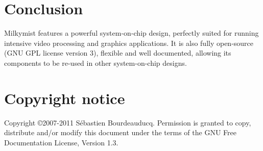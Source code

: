 \documentclass[a4paper,11pt,twocolumn]{paper}
\begin{document}
\section{Conclusion}
Milkymist features a powerful system-on-chip design, perfectly suited for running intensive video processing and graphics applications. It is also fully open-source (GNU GPL license version 3), flexible and well documented, allowing its components to be re-used in other system-on-chip designs.

\section*{Copyright notice}
Copyright \copyright 2007-2011 S\'ebastien Bourdeauducq. Permission is granted to copy, distribute and/or modify this document under the terms of the GNU Free Documentation License, Version 1.3.

{}

\end{document}
